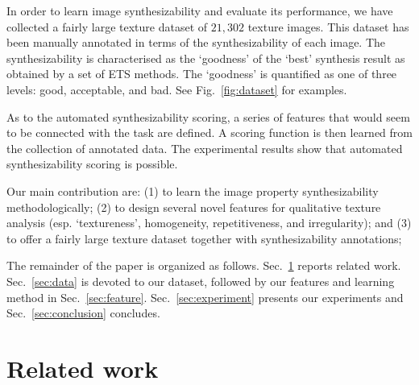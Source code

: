\documentclass[10pt,twocolumn,letterpaper]{article}
\begin{document}
In order to learn image synthesizability and evaluate its performance, we have collected
a fairly large texture dataset of $21,302$ texture images. This dataset has been manually annotated 
in terms of the synthesizability of each image. The synthesizability is characterised as the 
`goodness' of the `best' synthesis result as obtained by a set of ETS methods. The `goodness' is quantified 
as one of three levels: good, acceptable, and bad. See Fig.~\ref{fig:dataset} for examples. 



As to the automated synthesizability scoring, a series of features
that would seem to be connected with the task are defined.  A scoring
function is then learned from the collection of annotated data.  The
experimental results show that automated synthesizability scoring is
possible.

Our main contribution are: (1) to learn the image property
synthesizability methodologically; (2) to design several novel
features for qualitative texture analysis (esp. `textureness',
homogeneity, repetitiveness, and irregularity); and (3) to offer a fairly
large texture dataset together with synthesizability annotations;


The remainder of the paper is organized as follows.
Sec.~\ref{sec:related} reports related work.
Sec.~\ref{sec:data} is devoted to our dataset, followed by our features and learning method in Sec.~\ref{sec:feature}.
Sec.~\ref{sec:experiment} presents our experiments and Sec.~\ref{sec:conclusion} concludes. 


\section{Related work}
\label{sec:related}
\end{document}
